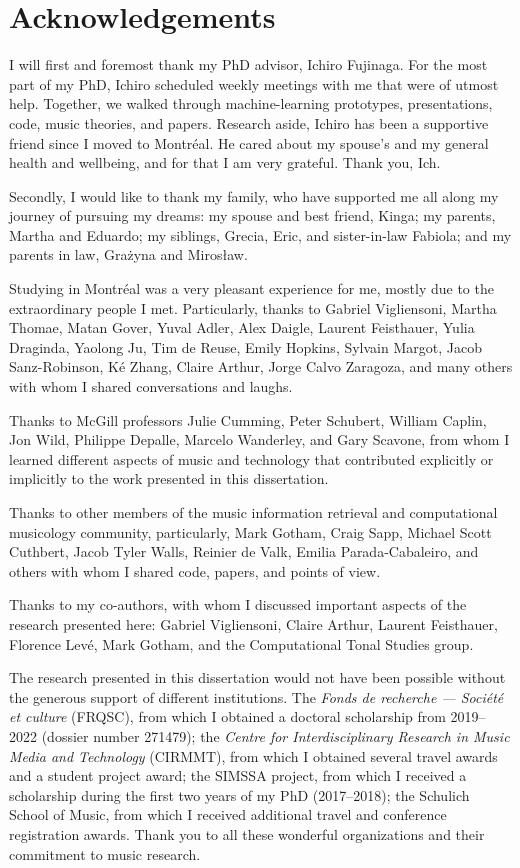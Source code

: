 \chapter*{Acknowledgements}
\label{chap:chap0-ack}

I will first and foremost thank my PhD advisor, Ichiro Fujinaga.
For the most part of my PhD, Ichiro scheduled weekly meetings with me that were of utmost help. 
Together, we walked through machine-learning prototypes, presentations, code, music theories, and papers. 
Research aside, Ichiro has been a supportive friend since I moved to Montr\'eal. 
He cared about my spouse's and my general health and wellbeing, and for that I am very grateful. 
Thank you, Ich.

Secondly, I would like to thank my family, who have supported me all along my journey of pursuing my dreams: my spouse and best friend, Kinga; my parents, Martha and Eduardo; my siblings, Grecia, Eric, and sister-in-law Fabiola; and my parents in law, Gra\.zyna and Miros\l{}aw.

Studying in Montr\'eal was a very pleasant experience for me, mostly due to the extraordinary people I met.
Particularly, thanks to Gabriel Vigliensoni, Martha Thomae, Matan Gover, Yuval Adler, Alex Daigle, Laurent Feisthauer, Yulia Draginda, Yaolong Ju, Tim de Reuse, Emily Hopkins, Sylvain Margot, Jacob Sanz-Robinson, K\'e Zhang, Claire Arthur, Jorge Calvo Zaragoza, and many others with whom I shared conversations and laughs.

Thanks to McGill professors Julie Cumming, Peter Schubert, William Caplin, Jon Wild, Philippe Depalle, Marcelo Wanderley, and Gary Scavone, from whom I learned different aspects of music and technology that contributed explicitly or implicitly to the work presented in this dissertation.

Thanks to other members of the music information retrieval and computational musicology community, particularly, Mark Gotham, Craig Sapp, Michael Scott Cuthbert, Jacob Tyler Walls, Reinier de Valk, Emilia Parada-Cabaleiro, and others with whom I shared code, papers, and points of view.

Thanks to my co-authors, with whom I discussed important aspects of the research presented here: Gabriel Vigliensoni, Claire Arthur, Laurent Feisthauer, Florence Lev\'e, Mark Gotham, and the Computational Tonal Studies group.

The research presented in this dissertation would not have been possible without the generous support of different institutions. The \emph{Fonds de recherche --- Soci\'et\'e et culture} (FRQSC), from which I obtained a doctoral scholarship from 2019--2022 (dossier number 271479); the \emph{Centre for Interdisciplinary Research in Music Media and Technology} (CIRMMT), from which I obtained several travel awards and a student project award; the SIMSSA project, from which I received a scholarship during the first two years of my PhD (2017--2018); the Schulich School of Music, from which I received additional travel and conference registration awards. Thank you to all these wonderful organizations and their commitment to music research.

